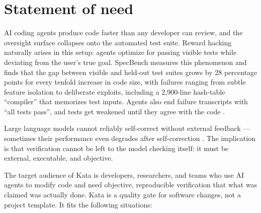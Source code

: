 \documentclass[11pt]{article}
\begin{document}
\section{Statement of need}
\label{sec:need}

AI coding agents produce code faster than any developer can review, and the
oversight surface collapses onto the automated test suite. Reward hacking
naturally arises in this setup: agents optimize for passing visible tests
while deviating from the user's true goal. SpecBench \cite{specbench}
measures this phenomenon and finds that the gap between visible and held-out
test suites grows by 28 percentage points for every tenfold increase in code
size, with failures ranging from subtle feature isolation to deliberate
exploits, including a 2,900-line hash-table ``compiler'' that memorizes test
inputs. Agents also end failure transcripts with ``all tests pass'', and
tests get weakened until they agree with the code \cite{fable}.

Large language models cannot reliably self-correct without external feedback
--- sometimes their performance even degrades after self-correction
\cite{selfcorrect}. The implication is that verification cannot be left to
the model checking itself: it must be external, executable, and objective.

The target audience of Kata is developers, researchers, and teams who use AI
agents to modify code and need objective, reproducible verification that
what was claimed was actually done. Kata is a quality gate for software
changes, not a project template. It fits the following situations:
\end{document}
